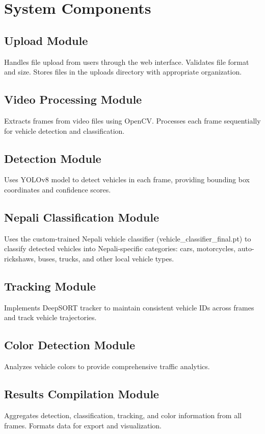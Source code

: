 \documentclass[12pt,a4paper]{report}
\begin{document}
\section{System Components}

\subsection{Upload Module}
Handles file upload from users through the web interface. Validates file format and size. Stores files in the uploads directory with appropriate organization.

\subsection{Video Processing Module}
Extracts frames from video files using OpenCV. Processes each frame sequentially for vehicle detection and classification.

\subsection{Detection Module}
Uses YOLOv8 model to detect vehicles in each frame, providing bounding box coordinates and confidence scores.

\subsection{Nepali Classification Module}
Uses the custom-trained Nepali vehicle classifier (vehicle\_classifier\_final.pt) to classify detected vehicles into Nepali-specific categories: cars, motorcycles, auto-rickshaws, buses, trucks, and other local vehicle types.

\subsection{Tracking Module}
Implements DeepSORT tracker to maintain consistent vehicle IDs across frames and track vehicle trajectories.

\subsection{Color Detection Module}
Analyzes vehicle colors to provide comprehensive traffic analytics.

\subsection{Results Compilation Module}
Aggregates detection, classification, tracking, and color information from all frames. Formats data for export and visualization.
\end{document}
